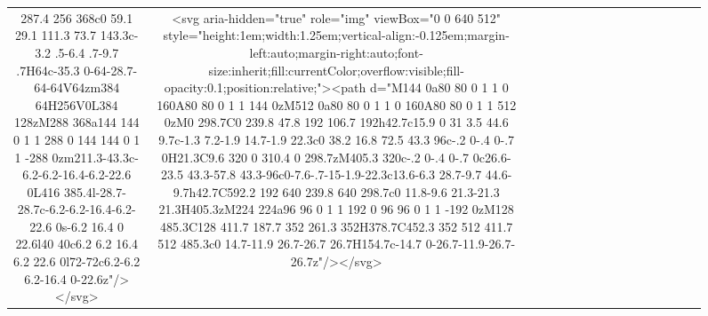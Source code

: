\documentclass[
]{article}
\begin{document}
\begin{figure*}
\begin{longtable*}{cclllccccccccccl}
287.4 256 368c0 59.1 29.1 111.3 73.7 143.3c-3.2 .5-6.4 .7-9.7 .7H64c-35.3 0-64-28.7-64-64V64zm384 64H256V0L384 128zM288 368a144 144 0 1 1 288 0 144 144 0 1 1 -288 0zm211.3-43.3c-6.2-6.2-16.4-6.2-22.6 0L416 385.4l-28.7-28.7c-6.2-6.2-16.4-6.2-22.6 0s-6.2 16.4 0 22.6l40 40c6.2 6.2 16.4 6.2 22.6 0l72-72c6.2-6.2 6.2-16.4 0-22.6z"/></svg> & <svg aria-hidden="true" role="img" viewBox="0 0 640 512" style="height:1em;width:1.25em;vertical-align:-0.125em;margin-left:auto;margin-right:auto;font-size:inherit;fill:currentColor;overflow:visible;fill-opacity:0.1;position:relative;"><path d="M144 0a80 80 0 1 1 0 160A80 80 0 1 1 144 0zM512 0a80 80 0 1 1 0 160A80 80 0 1 1 512 0zM0 298.7C0 239.8 47.8 192 106.7 192h42.7c15.9 0 31 3.5 44.6 9.7c-1.3 7.2-1.9 14.7-1.9 22.3c0 38.2 16.8 72.5 43.3 96c-.2 0-.4 0-.7 0H21.3C9.6 320 0 310.4 0 298.7zM405.3 320c-.2 0-.4 0-.7 0c26.6-23.5 43.3-57.8 43.3-96c0-7.6-.7-15-1.9-22.3c13.6-6.3 28.7-9.7 44.6-9.7h42.7C592.2 192 640 239.8 640 298.7c0 11.8-9.6 21.3-21.3 21.3H405.3zM224 224a96 96 0 1 1 192 0 96 96 0 1 1 -192 0zM128 485.3C128 411.7 187.7 352 261.3 352H378.7C452.3 352 512 411.7 512 485.3c0 14.7-11.9 26.7-26.7 26.7H154.7c-14.7 0-26.7-11.9-26.7-26.7z"/></svg> &  \\ 

\end{longtable*}
\end{figure*}
\end{document}

